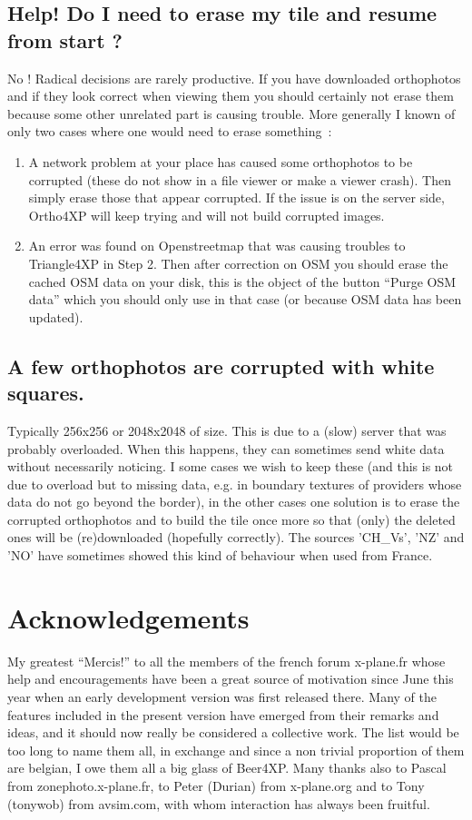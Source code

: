 \documentclass[12pt]{article}
\begin{document}
\subsection{Help! Do I need to erase my tile and resume from start ?}
No ! Radical decisions are rarely productive. If you have downloaded orthophotos and if they look correct when viewing them you should certainly not erase them because some other unrelated part is causing trouble.
More generally I known of only two cases where one would need to erase something~:
\begin{enumerate}
  \item A network problem at your place has caused some orthophotos to be corrupted (these do not show in a file viewer or make a viewer crash). Then simply erase those that appear corrupted. If the issue is on the server side, Ortho4XP will keep trying and will not build corrupted images.
  \item An error was found on Openstreetmap that was causing troubles to Triangle4XP in Step 2.
  Then after correction on OSM you should erase the cached OSM data on your disk, this is the object of the button ``Purge OSM data'' which you should only use in that case (or because OSM data has been updated).
\end{enumerate}
\subsection{A few orthophotos are corrupted with white squares.}
Typically 256x256 or 2048x2048 of size. This is due to a (slow) server that was probably overloaded.  When this happens, they can sometimes send white data without necessarily noticing. I some cases we wish to keep these (and this is not due to overload but to missing data, e.g. in boundary textures of providers whose data do not go beyond the border), in the other cases one solution is to erase the corrupted orthophotos and to build the tile once more so that (only) the deleted ones will be (re)downloaded (hopefully correctly).
The sources 'CH\_Vs', 'NZ' and 'NO' have sometimes showed this kind of behaviour when used from France.

\section{Acknowledgements}
My greatest ``Mercis!'' to all the members of the french forum x-plane.fr whose help and encouragements have been a great source of motivation since June this year when an early development version was first released there. Many of the features included in the present version have emerged from their remarks and ideas, and it should now really be considered a collective work. The list would be too long to name them all, in exchange and since a non trivial proportion of them are belgian, I owe them all a big glass of Beer4XP. Many thanks also to Pascal from zonephoto.x-plane.fr, to Peter (Durian) from x-plane.org and to Tony (tonywob) from avsim.com, with whom interaction has always been fruitful.
\end{document}
